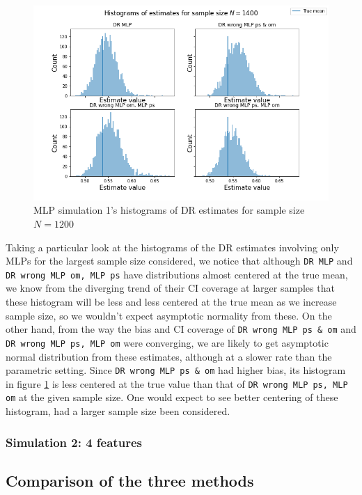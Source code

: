 \documentclass[12pt,twoside]{article}
\begin{document}
\begin{figure}[h!]
    \centering
    \includegraphics[width = 0.9\columnwidth]{figures/histMLP.png}
    \caption{MLP simulation 1's histograms of DR estimates for sample size $N = 1200$}
    \label{fighistMLP}
\end{figure}

Taking a particular look at the histograms of the DR estimates involving only MLPs for the largest sample size considered, we notice that although \texttt{DR MLP} and \texttt{DR wrong MLP om, MLP ps} have distributions almost centered at the true mean, we know from the diverging trend of their CI coverage at larger samples that these histogram will be less and less centered at the true mean as we increase sample size, so we wouldn't expect asymptotic normality from these. On the other hand, from the way the bias and CI coverage of \texttt{DR wrong MLP ps \& om} and \texttt{DR wrong MLP ps, MLP om} were converging, we are likely to get asymptotic normal distribution from these estimates, although at a slower rate than the parametric setting. Since \texttt{DR wrong MLP ps \& om} had higher bias, its histogram in figure \ref{fighistMLP} is less centered at the true value than that of \texttt{DR wrong MLP ps, MLP om} at the given sample size. One would expect to see better centering of these histogram, had a larger sample size been considered.
\clearpage
\subsubsection{Simulation 2: 4 features}


\clearpage
\subsection{Comparison of the three methods}
\end{document}
